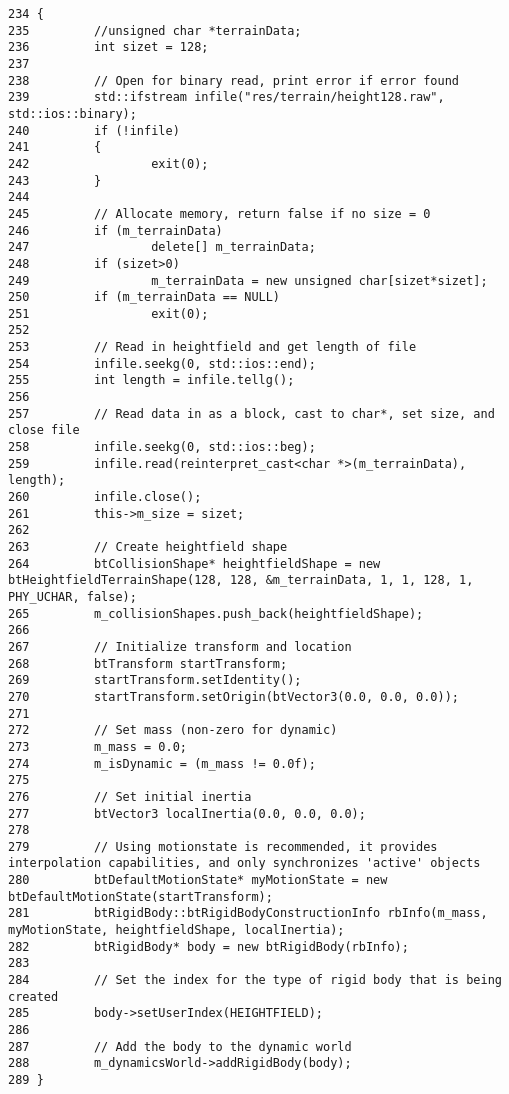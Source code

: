 \begin{Code}\begin{verbatim}234 {
235         //unsigned char *terrainData;
236         int sizet = 128;
237 
238         // Open for binary read, print error if error found
239         std::ifstream infile("res/terrain/height128.raw", std::ios::binary);
240         if (!infile)
241         {
242                 exit(0);
243         }
244 
245         // Allocate memory, return false if no size = 0
246         if (m_terrainData)
247                 delete[] m_terrainData;
248         if (sizet>0)
249                 m_terrainData = new unsigned char[sizet*sizet];
250         if (m_terrainData == NULL)
251                 exit(0);
252 
253         // Read in heightfield and get length of file
254         infile.seekg(0, std::ios::end);
255         int length = infile.tellg();
256 
257         // Read data in as a block, cast to char*, set size, and close file
258         infile.seekg(0, std::ios::beg);
259         infile.read(reinterpret_cast<char *>(m_terrainData), length);
260         infile.close();
261         this->m_size = sizet;
262 
263         // Create heightfield shape
264         btCollisionShape* heightfieldShape = new btHeightfieldTerrainShape(128, 128, &m_terrainData, 1, 1, 128, 1, PHY_UCHAR, false);
265         m_collisionShapes.push_back(heightfieldShape);
266 
267         // Initialize transform and location
268         btTransform startTransform;
269         startTransform.setIdentity();
270         startTransform.setOrigin(btVector3(0.0, 0.0, 0.0));
271 
272         // Set mass (non-zero for dynamic)
273         m_mass = 0.0;
274         m_isDynamic = (m_mass != 0.0f);
275 
276         // Set initial inertia
277         btVector3 localInertia(0.0, 0.0, 0.0);
278 
279         // Using motionstate is recommended, it provides interpolation capabilities, and only synchronizes 'active' objects
280         btDefaultMotionState* myMotionState = new btDefaultMotionState(startTransform);
281         btRigidBody::btRigidBodyConstructionInfo rbInfo(m_mass, myMotionState, heightfieldShape, localInertia);
282         btRigidBody* body = new btRigidBody(rbInfo);
283 
284         // Set the index for the type of rigid body that is being created
285         body->setUserIndex(HEIGHTFIELD);
286 
287         // Add the body to the dynamic world
288         m_dynamicsWorld->addRigidBody(body);
289 }
\end{verbatim}
\end{Code}




